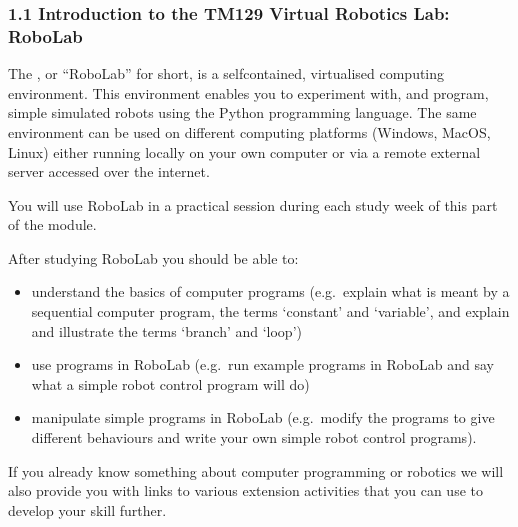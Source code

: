 \documentclass[letterpaper,10pt,english]{sphinxmanual}
\begin{document}


\subsubsection{1.1 Introduction to the TM129 Virtual Robotics Lab: RoboLab}
\label{\detokenize{content/00_SOFTWARE_GUIDE/Section_00_01_Jupyter_environment:1.1-Introduction-to-the-TM129-Virtual-Robotics-Lab:-RoboLab}}
The , or “RoboLab” for short, is a self\sphinxhyphen{}contained, virtualised computing environment. This environment enables you to experiment with, and program, simple simulated robots using the Python programming language. The same environment can be used on different computing platforms (Windows, MacOS, Linux) either running locally on your own computer or via a remote external server accessed over the internet.

You will use RoboLab in a practical session during each study week of this part of the module.

After studying RoboLab you should be able to:
\begin{itemize}
\item {} 
understand the basics of computer programs (e.g. explain what is meant by a sequential computer program, the terms ‘constant’ and ‘variable’, and explain and illustrate the terms ‘branch’ and ‘loop’)

\item {} 
use programs in RoboLab (e.g. run example programs in RoboLab and say what a simple robot control program will do)

\item {} 
manipulate simple programs in RoboLab (e.g. modify the programs to give different behaviours and write your own simple robot control programs).

\end{itemize}

If you already know something about computer programming or robotics we will also provide you with links to various extension activities that you can use to develop your skill further.
\end{document}
